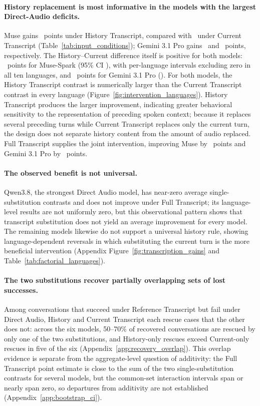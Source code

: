 \documentclass{article}
\begin{document}
\paragraph{History replacement is most informative in the models with the largest Direct-Audio deficits.}
Muse gains \resMuseFactorialHistory\ points under History Transcript, compared with \resMuseFactorialCurrent\ under Current Transcript (Table~\ref{tab:input_conditions}); Gemini 3.1 Pro gains \resGProFactorialHistory\ and \resGProFactorialCurrent\ points, respectively. The History--Current difference itself is positive for both models: \resMuseHMinusCPoint\ points for Muse-Spark (95\% CI \resMuseHMinusCCI), with per-language intervals excluding zero in all ten languages, and \resGProHMinusCPoint\ points for Gemini 3.1 Pro (\resGProHMinusCCI). For both models, the History Transcript contrast is numerically larger than the Current Transcript contrast in every language (Figure~\ref{fig:intervention_languages}). History Transcript produces the larger improvement, indicating greater behavioral sensitivity to the representation of preceding spoken context; because it replaces several preceding turns while Current Transcript replaces only the current turn, the design does not separate history content from the amount of audio replaced. Full Transcript supplies the joint intervention, improving Muse by \resMuseFactorialFull\ points and Gemini 3.1 Pro by \resGProFactorialFull\ points.

\paragraph{The observed benefit is not universal.}
Qwen3.8, the strongest Direct Audio model, has near-zero average single-substitution contrasts and does not improve under Full Transcript; its language-level results are not uniformly zero, but this observational pattern shows that transcript substitution does not yield an average improvement for every model. The remaining models likewise do not support a universal history rule, showing language-dependent reversals in which substituting the current turn is the more beneficial intervention (Appendix Figure~\ref{fig:transcription_gains} and Table~\ref{tab:factorial_languages}).

\paragraph{The two substitutions recover partially overlapping sets of lost successes.}
Among conversations that succeed under Reference Transcript but fail under Direct Audio, History and Current Transcript each rescue cases that the other does not: across the six models, 50--70\% of recovered conversations are rescued by only one of the two substitutions, and History-only rescues exceed Current-only rescues in five of the six (Appendix~\ref{app:recovery_overlap}). This overlap evidence is separate from the aggregate-level question of additivity: the Full Transcript point estimate is close to the sum of the two single-substitution contrasts for several models, but the common-set interaction intervals span or nearly span zero, so departures from additivity are not established (Appendix~\ref{app:bootstrap_ci}).
\end{document}
